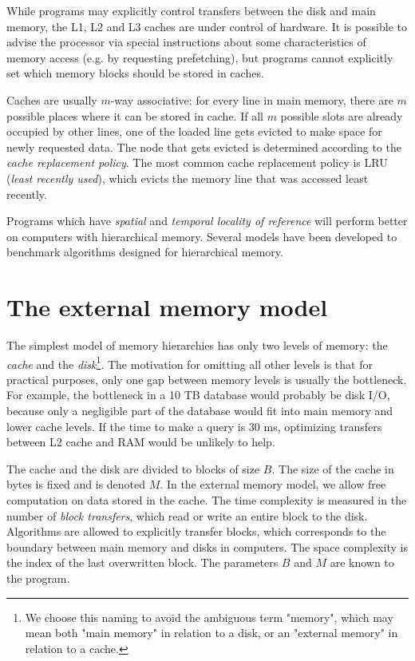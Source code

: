 While programs may explicitly control transfers between the disk and main
memory, the L1, L2 and L3 caches are under control of hardware.
It is possible to advise the processor via special instructions about some
characteristics of memory access (e.g. by requesting prefetching), but programs
cannot explicitly set which memory blocks should be stored in caches.

Caches are usually $m$-way associative: for every line in main memory, there
are $m$ possible places where it can be stored in cache. If all $m$ possible
slots are already occupied by other lines, one of the loaded line gets evicted
to make space for newly requested data. The node that gets evicted is determined
according to the \textit{cache replacement policy}. The most common cache
replacement policy is LRU (\textit{least recently used}), which evicts
the memory line that was accessed least recently.

Programs which have \textit{spatial} and \textit{temporal locality of reference}
will perform better on computers with hierarchical memory. Several models have
been developed to benchmark algorithms designed for hierarchical memory.

\section{The external memory model}
The simplest model of memory hierarchies has only two levels of memory:
the \textit{cache} and the \textit{disk}\footnote{
	We choose this naming to avoid the ambiguous term "memory",
	which may mean both "main memory" in relation to a disk,
	or an "external memory" in relation to a cache.
}. The motivation for omitting all other levels is that for practical purposes,
only one gap between memory levels is usually the bottleneck. For example,
the bottleneck in a 10 TB database would probably be disk I/O, because
only a negligible part of the database would fit into main memory and
lower cache levels. If the time to make a query is 30 ms, optimizing transfers
between L2 cache and RAM would be unlikely to help.

The cache and the disk are divided to blocks of size $B$. The size of the cache 
in bytes is fixed and is denoted $M$.
In the external memory model, we allow free computation on data
stored in the cache. The time complexity is measured in the number of
\textit{block transfers}, which read or write an entire block to the disk.
Algorithms are allowed to explicitly transfer blocks, which corresponds
to the boundary between main memory and disks in computers.
The space complexity is the index of the last overwritten block.
The parameters $B$ and $M$ are known to the program.


